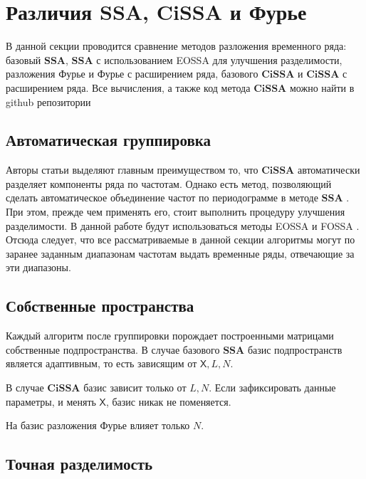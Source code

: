 \documentclass[a4paper, 11pt]{article}
\newcommand{\SSA}{\textbf{SSA}}
\newcommand{\CISSA}{\textbf{CiSSA}}
\newcommand{\TS}{\mathsf{X}}
\begin{document}
\section{Различия SSA, CiSSA и Фурье}
\label{sec:comparison_cissa}
В данной секции проводится сравнение методов разложения временного ряда: базовый $\SSA$,  $\SSA$ с использованием EOSSA для улучшения разделимости, разложения Фурье и Фурье с расширением ряда, базового $\CISSA$ и $\CISSA$ с расширением ряда. Все вычисления, а также код метода $\CISSA$ можно найти в github репозитории \cite{spbu_cissa_coursework_github}


\subsection{Автоматическая группировка}

\label{subsubsec:autogroup}

Авторы статьи \cite{bogalo2020} выделяют главным преимуществом то, что $\CISSA$ автоматически разделяет компоненты ряда по частотам. Однако есть метод, позволяющий сделать автоматическое объединение частот по периодограмме в методе $\SSA$
\cite{golyandina2023automatedidentificationsingularspectrum}
. При этом, прежде чем применять его, стоит выполнить процедуру улучшения разделимости. В данной работе будут использоваться методы EOSSA и FOSSA \cite{golyandina2023intelligent}. Отсюда следует, что все рассматриваемые в данной секции алгоритмы могут по заранее заданным диапазонам частотам выдать временные ряды, отвечающие за эти диапазоны.



\subsection{Собственные пространства}
Каждый алгоритм после группировки порождает построенными матрицами собственные подпространства. В случае базового $\SSA$ базис подпространств является адаптивным, то есть зависящим от $\TS, L, N$.

В случае $\CISSA$ базис зависит только от $L, N$. Если зафиксировать данные параметры, и менять $\TS$, базис никак не поменяется.

На базис разложения Фурье влияет только $N$.


\subsection{Точная разделимость}
\label{subsubsec:exact}
\end{document}
